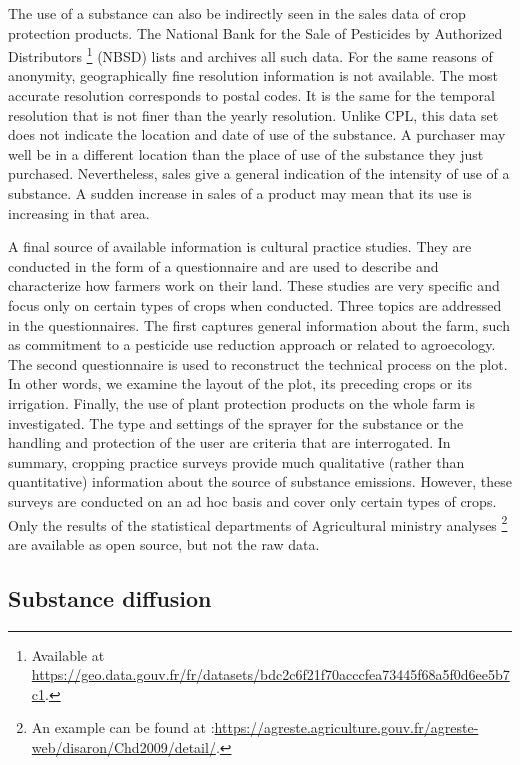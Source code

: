 The use of a substance can also be indirectly seen in the sales data of crop protection products. The National Bank for the Sale of Pesticides by Authorized Distributors \footnote{Available at \url{https://geo.data.gouv.fr/fr/datasets/bdc2c6f21f70acccfea73445f68a5f0d6ee5b7c1}.} (NBSD) lists and archives all such data. For the same reasons of anonymity, geographically fine resolution information is not available. The most accurate resolution corresponds to postal codes. It is the same for the temporal resolution that is not finer than the yearly resolution. Unlike CPL, this data set does not indicate the location and date of use of the substance. A purchaser may well be in a different location than the place of use of the substance they just purchased. Nevertheless, sales give a general indication of the intensity of use of a substance. A sudden increase in sales of a product may mean that its use is increasing in that area.  

A final source of available information is cultural practice studies. They are conducted in the form of a questionnaire and are used to describe and characterize how farmers work on their land. These studies are very specific and focus only on certain types of crops when conducted. Three topics are addressed in the questionnaires. The first captures general information about the farm, such as commitment to a pesticide use reduction approach or related to agroecology. The second questionnaire is used to reconstruct the technical process on the plot. In other words, we examine the layout of the plot, its preceding crops or its irrigation. Finally, the use of plant protection products on the whole farm is investigated. The type and settings of the sprayer for the substance or the handling and protection of the user are criteria that are interrogated. In summary, cropping practice surveys provide much qualitative (rather than quantitative) information about the source of substance emissions. However, these surveys are conducted on an ad hoc basis and cover only certain types of crops. Only the results of the statistical departments of Agricultural ministry analyses \footnote{An example can be found at :\url{https://agreste.agriculture.gouv.fr/agreste-web/disaron/Chd2009/detail/}.} are available as open source, but not the raw data.  

\subsection{Substance diffusion}

